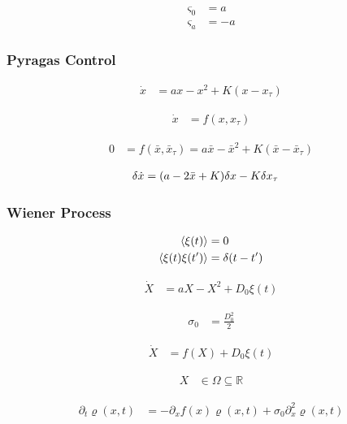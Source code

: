 \documentclass[a4paper,10pt]{article}
\begin{document}
\begin{align}
	\varsigma_0
	&=
	a
\\
	\varsigma_a
	&=
	-a
\end{align}

\subsubsection{Pyragas Control}

\begin{align}
	\dot{x}
	&=
	a
	x
	-
	x^2
	+
	K
	(x-x_\tau)	
\end{align}

\begin{align}
	\dot{x}
	&=
	f(x,x_\tau)
\end{align}

\begin{align}
	0
	&=
	f(\bar{x},\bar{x}_\tau)
	=
	a\bar{x}
	-
	\bar{x}^2
	+
	K
	(\bar{x}-\bar{x}_\tau)	
\end{align}

\begin{align}
	\delta
	\dot{x}
	&=
	\pqty{
		a
		-
		2\bar{x}
		+
		K
	}
	\delta x
	-
	K
	\delta x_\tau
\end{align}

\subsubsection{Wiener Process}

\begin{align}
	\expval{\xi(t)}
	&=
	0
\\
	\expval{\xi(t)\xi(t^\prime)}
	&=
	\delta(t-t^\prime)
\end{align}

\begin{align}
	\dot{X}
	&=
	aX
	-
	X^2
	+
	D_0
	\xi(t)
\end{align}

\begin{align}
	\sigma_0
	&=
	\frac{
		D_0^2
	}{2}
\end{align}

\begin{align}
	\dot{X}
	&=
	f(X)
	+
	D_0
	\xi(t)
\end{align}

\begin{align}
	X
	&\in
	\Omega
	\subseteq
	\mathbb{R}
\end{align}

\begin{align}
	\partial_t
	\varrho(x,t)
	&=
	-
	\partial_x
	f(x)
	\varrho(x,t)
	+
	\sigma_0
	\partial_x^2
	\varrho(x,t)	
\end{align}
\end{document}
